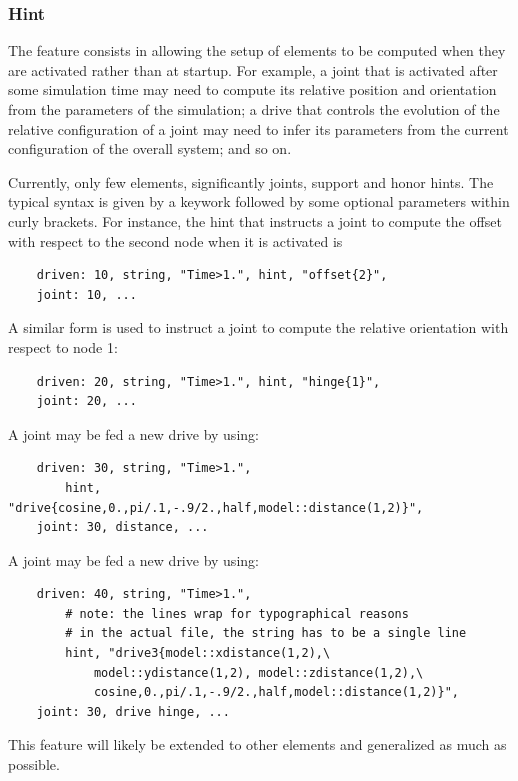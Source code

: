 \subsubsection{Hint}
The  feature consists in allowing the setup of elements
to be computed when they are activated rather than at startup.
For example, a joint that is activated after some simulation time
may need to compute its relative position and orientation
from the parameters of the simulation; a drive that controls
the evolution of the relative configuration of a joint may need
to infer its parameters from the current configuration
of the overall system; and so on.

Currently, only few elements, significantly joints, support 
and honor hints.
The typical syntax is given by a keywork followed by some optional
parameters within curly brackets.
For instance, the hint that instructs a joint to compute the offset
with respect to the second node when it is activated is
\begin{verbatim}
    driven: 10, string, "Time>1.", hint, "offset{2}",
    joint: 10, ...
\end{verbatim}
A similar form is used to instruct a joint to compute the relative
orientation with respect to node 1:
\begin{verbatim}
    driven: 20, string, "Time>1.", hint, "hinge{1}",
    joint: 20, ...
\end{verbatim}
A  joint may be fed a new drive by using:
\begin{verbatim}
    driven: 30, string, "Time>1.",
        hint, "drive{cosine,0.,pi/.1,-.9/2.,half,model::distance(1,2)}",
    joint: 30, distance, ... 
\end{verbatim}
A  joint may be fed a new drive by using:
\begin{verbatim}
    driven: 40, string, "Time>1.",
        # note: the lines wrap for typographical reasons
        # in the actual file, the string has to be a single line
        hint, "drive3{model::xdistance(1,2),\
            model::ydistance(1,2), model::zdistance(1,2),\
            cosine,0.,pi/.1,-.9/2.,half,model::distance(1,2)}",
    joint: 30, drive hinge, ... 
\end{verbatim}

This feature will likely be extended to other elements
and generalized as much as possible.


